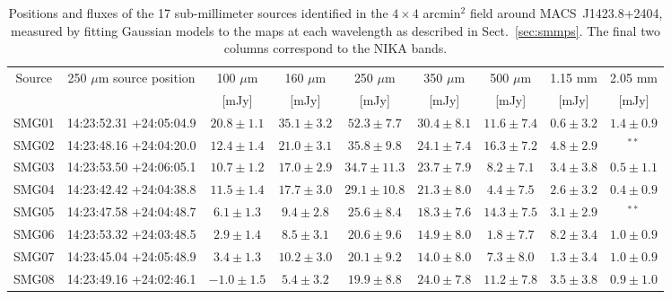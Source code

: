 \documentclass[twocolumn,traditabstract]{aa}
\begin{document}
\begin{table}[h]
\caption{\footnotesize Positions and fluxes of the 17 sub-millimeter sources identified in the $4 \times 4$ arcmin$^2$ field around \mbox{MACS~J1423.8+2404}, measured by fitting Gaussian models to the maps at each wavelength as described in Sect.~\ref{sec:smmps}. The final two columns correspond to the NIKA bands.}
\begin{center}
\begin{tabular}{ccccccccc}
\hline
\hline
Source & 250 $\mu$m source position & 100 $\mu$m & 160 $\mu$m & 250 $\mu$m & 350 $\mu$m & 500 $\mu$m & 1.15 mm & 2.05 mm \\
 &  & [mJy] & [mJy] & [mJy] & [mJy] & [mJy] & [mJy] & [mJy] \\
\hline
SMG01 & 14:23:52.31 +24:05:04.9 & $    20.8 \pm      1.1$ & $    35.1 \pm      3.2$ & $    52.3 \pm      7.7$ & $    30.4 \pm      8.1$ & $    11.6 \pm      7.4$ & $     0.6 \pm      3.2$ & $     1.4 \pm      0.9$ \\
SMG02 & 14:23:48.16 +24:04:20.0 & $    12.4 \pm      1.4$ & $    21.0 \pm      3.1$ & $    35.8 \pm      9.8$ & $    24.1 \pm      7.4$ & $    16.3 \pm      7.2$ & $     4.8 \pm      2.9$ & $^{**}$ \\
SMG03 & 14:23:53.50 +24:06:05.1 & $    10.7 \pm      1.2$ & $    17.0 \pm      2.9$ & $    34.7 \pm     11.3$ & $    23.7 \pm      7.9$ & $     8.2 \pm      7.1$ & $     3.4 \pm      3.8$ & $     0.5 \pm      1.1$ \\
SMG04 & 14:23:42.42 +24:04:38.8 & $    11.5 \pm      1.4$ & $    17.7 \pm      3.0$ & $    29.1 \pm     10.8$ & $    21.3 \pm      8.0$ & $     4.4 \pm      7.5$ & $     2.6 \pm      3.2$ & $     0.4 \pm      0.9$ \\
SMG05 & 14:23:47.58 +24:04:48.7 & $     6.1 \pm      1.3$ & $     9.4 \pm      2.8$ & $    25.6 \pm      8.4$ & $    18.3 \pm      7.6$ & $    14.3 \pm      7.5$ & $     3.1 \pm      2.9$ & $^{**}$ \\
SMG06 & 14:23:53.32 +24:03:48.5 & $     2.9 \pm      1.4$ & $     8.5 \pm      3.1$ & $    20.6 \pm      9.6$ & $    14.9 \pm      8.0$ & $     1.8 \pm      7.7$ & $     8.2 \pm      3.4$ & $     1.0 \pm      0.9$ \\
SMG07 & 14:23:45.04 +24:05:48.9 & $     3.4 \pm      1.3$ & $    10.2 \pm      3.0$ & $    20.1 \pm      9.2$ & $    14.0 \pm      8.0$ & $     7.3 \pm      8.0$ & $     1.3 \pm      3.4$ & $     1.0 \pm      0.9$ \\
SMG08 & 14:23:49.16 +24:02:46.1 & $    -1.0 \pm      1.5$ & $     5.4 \pm      3.2$ & $    19.9 \pm      8.8$ & $    24.0 \pm      7.8$ & $    11.2 \pm      7.8$ & $     3.5 \pm      3.8$ & $     0.9 \pm      1.0$ \\

\end{tabular}
\end{center}
\end{table}
\end{document}
